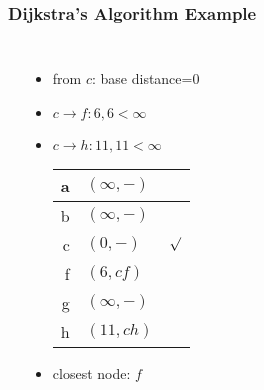 \documentclass[dvipsnames]{beamer}
\begin{document}
\begin{frame}
  \frametitle{Dijkstra's Algorithm Example}

  \begin{columns}
    \begin{center}
    \end{center}

    \begin{itemize}
      \item from $c$: base distance=$0$
      \item $c \rightarrow f: 6, 6 < \infty$
      \item $c \rightarrow h: 11, 11 < \infty$

      \pause
      \begin{table}
        \begin{tabular}{r|l|c}
          a & $(\infty,-)$ & \\\hline
          b & $(\infty,-)$ & \\\hline
          c & $(0,-)$      & $\surd$ \\\hline
          f & $(6,cf)$     & \\\hline
          g & $(\infty,-)$ & \\\hline
          h & $(11,ch)$    &
        \end{tabular}
      \end{table}

      \pause
      \item closest node: $f$
    \end{itemize}
  \end{columns}
\end{frame}
\end{document}
